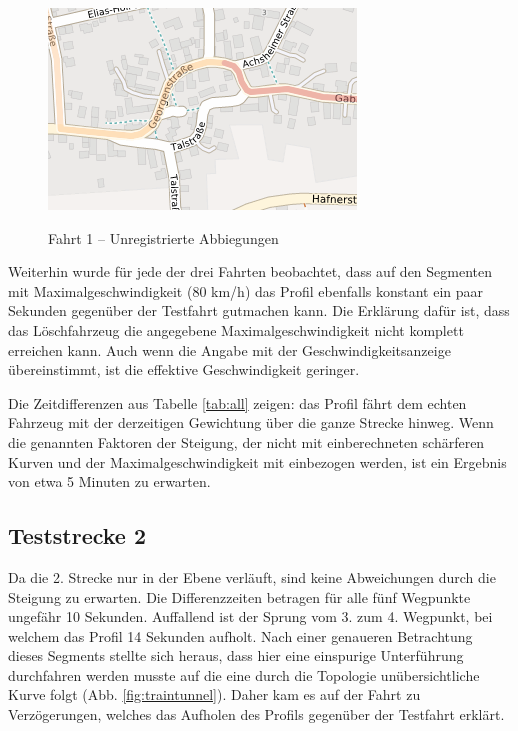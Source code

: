 \begin{figure}[htb]
\centering
\caption{Fahrt 1 -- Unregistrierte Abbiegungen}
\label{fig:curve}
\includegraphics[width = 0.50 \textwidth]{../media/Fahrt1_curve.png} \\
\end{figure}

Weiterhin wurde für jede der drei Fahrten beobachtet, dass auf den Segmenten mit Maximalgeschwindigkeit (80 km/h) das Profil ebenfalls konstant ein paar Sekunden gegenüber der Testfahrt gutmachen kann.
Die Erklärung dafür ist, dass das Löschfahrzeug die angegebene Maximalgeschwindigkeit nicht komplett erreichen kann.
Auch wenn die Angabe mit der Geschwindigkeitsanzeige übereinstimmt, ist die effektive Geschwindigkeit geringer.

Die Zeitdifferenzen aus Tabelle \ref{tab:all} zeigen: das Profil fährt dem echten Fahrzeug mit der derzeitigen Gewichtung über die ganze Strecke hinweg.
Wenn die genannten Faktoren der Steigung, der nicht mit einberechneten schärferen Kurven und der Maximalgeschwindigkeit mit einbezogen werden, ist ein Ergebnis von etwa 5 Minuten zu erwarten.

\subsection{Teststrecke 2}

Da die 2. Strecke nur in der Ebene verläuft, sind keine Abweichungen durch die Steigung zu erwarten.
Die Differenzzeiten betragen für alle fünf Wegpunkte ungefähr 10 Sekunden.
Auffallend ist der Sprung vom 3. zum 4. Wegpunkt, bei welchem das Profil 14 Sekunden aufholt.
Nach einer genaueren Betrachtung dieses Segments stellte sich heraus, dass hier eine einspurige Unterführung durchfahren werden musste auf die eine durch die Topologie unübersichtliche Kurve folgt (Abb. \ref{fig:traintunnel}).
Daher kam es auf der Fahrt zu Verzögerungen, welches das Aufholen des Profils gegenüber der Testfahrt erklärt.

